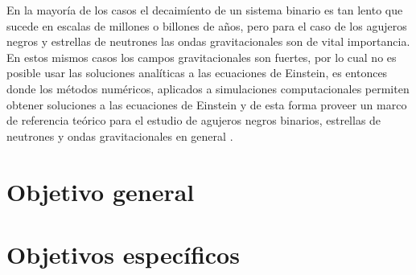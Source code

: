 	En la mayoría de los casos el decaimíento de un sistema binario es tan lento que sucede en escalas de millones o billones de años, pero para el caso de los agujeros negros y estrellas de neutrones las ondas gravitacionales son de vital importancia. En estos mismos casos los campos gravitacionales son fuertes, por lo cual no es posible usar las soluciones analíticas a las ecuaciones de Einstein, es entonces donde los métodos numéricos, aplicados a simulaciones computacionales permiten obtener soluciones a las ecuaciones de Einstein y de esta forma proveer un marco de referencia teórico para el estudio de agujeros negros binarios, estrellas de neutrones y ondas gravitacionales en general \cite{brugmann2018fundamentals}.
%	
	
\section{Objetivo general}
		
\section{Objetivos específicos}
	
